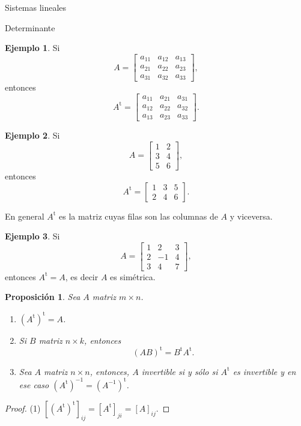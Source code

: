 \documentclass[a4paper,12pt,twoside,spanish,reqno]{amsbook}
\newtheorem{proposicion}[teorema]{Proposici\'on}
\theoremstyle{definition}
\newtheorem{ejemplo}{Ejemplo}[section]
\theoremstyle{remark}
\renewcommand{\t}{{\operatorname{t}}}
\begin{document}
\begin{chapter}{Sistemas lineales}
\begin{section}{Determinante}
    \begin{ejemplo} Si
        $$A=\begin{bmatrix}a_{11}&a_{12}&a_{13}\\a_{21}&a_{22}&a_{23}\\a_{31}&a_{32}&a_{33}\end{bmatrix},$$ 
        entonces
        $$A^\t=\begin{bmatrix}a_{11}&a_{21}&a_{31}\\a_{12}&a_{22}&a_{32}\\a_{13}&a_{23}&a_{33}\end{bmatrix}.$$ 
    \end{ejemplo}
    
    \begin{ejemplo}
        Si $$A=\begin{bmatrix}1&2\\3&4\\5&6\end{bmatrix},$$ 
        entonces
        $$A^\t=\begin{bmatrix}1&3&5\\2&4&6\end{bmatrix}.$$ 
    \end{ejemplo}
    
    
    En  general $A^\t$ es la matriz cuyas filas son las columnas de $A$ y viceversa. 
    
    \begin{ejemplo}
        Si 
        \begin{equation*}
            A=\begin{bmatrix}1&2&3\\2&-1&4\\3&4&7\end{bmatrix},
        \end{equation*}
        entonces $A^\t =A$, es decir  $A$ es simétrica.
    \end{ejemplo}
    
    \begin{proposicion}\label{prop-matriz-transpuesta} Sea $A$ matriz $m \times n$.
        \begin{enumerate}
            \item $(A^\t)^\t = A$.
            \item  Si $B$ matriz $n \times k$,  entonces
            \begin{equation*}
            (AB)^\t = B^\t A^\t.
            \end{equation*} 
            \item  Sea $A$ matriz $n \times n$, entonces, $A$ invertible si y sólo si  $A^\t$ es invertible y  en ese caso $(A^\t)^{-1} = (A^{-1})^\t$.
        \end{enumerate}
    \end{proposicion}
    \begin{proof}
        (1) 	$[(A^\t)^\t]_{ij} = [A^\t]_{ji} = [A]_{ij}$. 
        

\end{proof}
\end{section}
\end{chapter}
\end{document}
